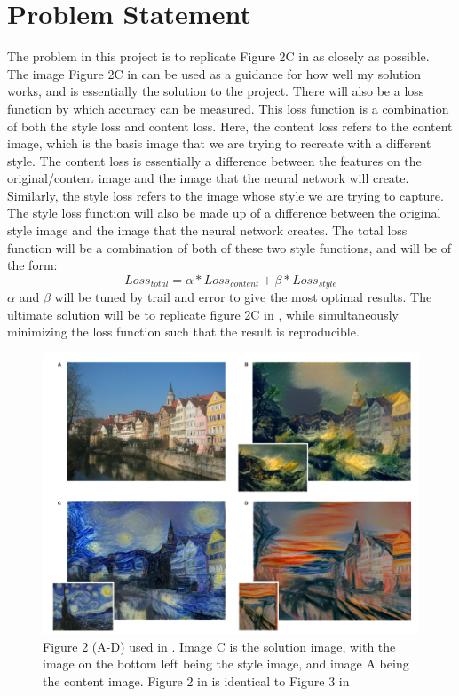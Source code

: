\documentclass[9pt]{article}
\begin{document}
\section{Problem Statement}
The problem in this project is to replicate Figure 2C in \cite{Neural} as closely as possible. The image Figure 2C in \cite{Neural} can be used as a guidance for how well my solution works, and is essentially the solution to the project. There will also be a loss function by which accuracy can be measured. This loss function is a combination of both the style loss and content loss. Here, the content loss refers to the content image, which is the basis image that we are trying to recreate with a different style. The content loss is essentially a difference between the features on the original/content image and the  image that the neural network will create. Similarly, the style loss refers to the image whose style we are trying to capture. The style loss function will also be made up of a difference between the original style image and the image that the neural network creates. The total loss function will be a combination of both of these two style functions, and will be of the form:
\begin{equation}
Loss_{total} = \alpha * Loss_{content} + \beta * Loss_{style}
\end{equation}
$\alpha$ and $\beta$ will be tuned by trail and error to give the most optimal results. The ultimate solution will be to replicate figure 2C in \cite{Image}, while simultaneously minimizing the loss function such that the result is reproducible.

\begin{figure}
\centering
        \includegraphics[totalheight=8cm]{Figure2.png}
    \caption{Figure 2 (A-D) used in \cite{Neural}. Image C is the solution image, with the image on the bottom left being the style image, and image A being the content image. Figure 2 in \cite{Neural} is identical to Figure 3 in \cite{Image}}
    \label{fig:solution}
\end{figure}
\end{document}
